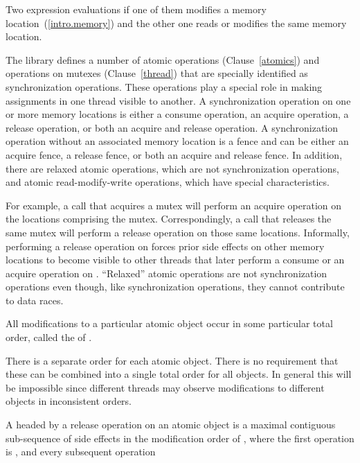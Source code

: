 \pnum
Two expression evaluations  if one of them modifies a memory
location~(\ref{intro.memory}) and the other one reads or modifies the same
memory location.

\pnum
The library defines a number of atomic operations (Clause~\ref{atomics}) and
operations on mutexes (Clause~\ref{thread}) that are specially identified as
synchronization operations. These operations play a special role in making
assignments in one thread visible to another. A synchronization operation on one
or more memory locations is either a consume operation, an acquire operation, a
release operation, or both an acquire and release operation. A synchronization
operation without an associated memory location is a fence and can be either an
acquire fence, a release fence, or both an acquire and release fence. In
addition, there are relaxed atomic operations, which are not synchronization
operations, and atomic read-modify-write operations, which have special
characteristics. \begin{note} For example, a call that acquires a mutex will
perform an acquire operation on the locations comprising the mutex.
Correspondingly, a call that releases the same mutex will perform a release
operation on those same locations. Informally, performing a release operation on
 forces prior
%
side effects on other memory locations to become visible
to other threads that later perform a consume or an acquire operation on
. ``Relaxed'' atomic operations are not synchronization operations even
though, like synchronization operations, they cannot contribute to data races.
\end{note}

\pnum
All modifications to a particular atomic object  occur in some
particular total order, called the  of .
\begin{note} There is a separate order for each
atomic object. There is no requirement that these can be combined into a single
total order for all objects. In general this will be impossible since different
threads may observe modifications to different objects in inconsistent orders.
\end{note}

\pnum
A  headed by a release operation  on an atomic object
 is a maximal contiguous sub-sequence of
%
side effects in the
modification order of , where the first operation is , and
every subsequent operation

